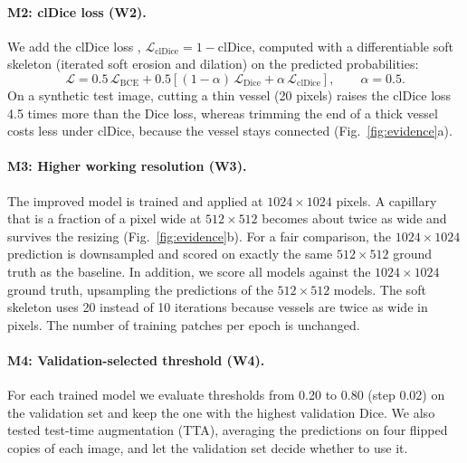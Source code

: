 \documentclass[a4paper,fleqn]{cas-sc}
\begin{document}
\paragraph{M2: clDice loss (W2).} We add the clDice loss \citep{shit2021cldice}, $\mathcal{L}_{\mathrm{clDice}} = 1 - \mathrm{clDice}$, computed with a differentiable soft skeleton (iterated soft erosion and dilation) on the predicted probabilities:
\begin{equation}
\mathcal{L} = 0.5\,\mathcal{L}_{\mathrm{BCE}} + 0.5\left[(1-\alpha)\,\mathcal{L}_{\mathrm{Dice}} + \alpha\,\mathcal{L}_{\mathrm{clDice}}\right], \qquad \alpha = 0.5.
\end{equation}
On a synthetic test image, cutting a thin vessel (20 pixels) raises the clDice loss 4.5 times more than the Dice loss, whereas trimming the end of a thick vessel costs less under clDice, because the vessel stays connected (Fig.~\ref{fig:evidence}a).

\paragraph{M3: Higher working resolution (W3).} The improved model is trained and applied at $1024\times1024$ pixels. A capillary that is a fraction of a pixel wide at $512\times512$ becomes about twice as wide and survives the resizing (Fig.~\ref{fig:evidence}b). For a fair comparison, the $1024\times1024$ prediction is downsampled and scored on exactly the same $512\times512$ ground truth as the baseline. In addition, we score all models against the $1024\times1024$ ground truth, upsampling the predictions of the $512\times512$ models. The soft skeleton uses 20 instead of 10 iterations because vessels are twice as wide in pixels. The number of training patches per epoch is unchanged.

\paragraph{M4: Validation-selected threshold (W4).} For each trained model we evaluate thresholds from 0.20 to 0.80 (step 0.02) on the validation set and keep the one with the highest validation Dice. We also tested test-time augmentation (TTA), averaging the predictions on four flipped copies of each image, and let the validation set decide whether to use it.
\end{document}
